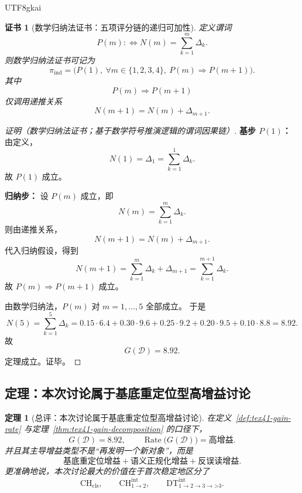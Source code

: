 \documentclass[12pt]{article}
\newtheorem{theorem}{定理}[section]
\newtheorem{Certificate}{证书}[section]
\newcommand{\Rate}{\operatorname{Rate}}
\begin{document}
\begin{CJK*}{UTF8}{gkai}
\begin{Certificate}[数学归纳法证书：五项评分链的递归可加性]
\label{cert:tex41-gain-decomposition}
定义谓词
\[
  P(m)
  :
  \Longleftrightarrow
  N(m)=\sum_{k=1}^{m}\Delta_k.
\]
则数学归纳法证书可记为
\[
  \pi_{\mathrm{ind}}
  =
  \bigl(
    P(1),\
    \forall m\in\{1,2,3,4\},\ P(m)\Rightarrow P(m+1)
  \bigr).
\]
其中
\[
  P(m)\Rightarrow P(m+1)
\]
仅调用递推关系
\[
  N(m+1)=N(m)+\Delta_{m+1}.
\]
\end{Certificate}

\begin{proof}[证明（数学归纳法证书；基于数学符号推演逻辑的谓词因果链）]
\textbf{基步 $P(1)$：}
由定义，
\[
  N(1)=\Delta_1=\sum_{k=1}^{1}\Delta_k.
\]
故 $P(1)$ 成立。

\textbf{归纳步：}
设 $P(m)$ 成立，即
\[
  N(m)=\sum_{k=1}^{m}\Delta_k.
\]
则由递推关系，
\[
  N(m+1)=N(m)+\Delta_{m+1}.
\]
代入归纳假设，得到
\[
  N(m+1)
  =
  \sum_{k=1}^{m}\Delta_k+\Delta_{m+1}
  =
  \sum_{k=1}^{m+1}\Delta_k.
\]
故 $P(m)\Rightarrow P(m+1)$ 成立。

由数学归纳法，$P(m)$ 对 $m=1,\dots,5$ 全部成立。
于是
\[
  N(5)
  =
  \sum_{k=1}^{5}\Delta_k
  =
  0.15\cdot 6.4
  +
  0.30\cdot 9.6
  +
  0.25\cdot 9.2
  +
  0.20\cdot 9.5
  +
  0.10\cdot 8.8
  =
  8.92.
\]
故
\[
  G(\mathcal D)=8.92.
\]
定理成立。证毕。
\end{proof}

\subsection{定理：本次讨论属于基底重定位型高增益讨论}
\label{subsec:tex41-ch2-theorem}

\begin{theorem}[总评：本次讨论属于基底重定位型高增益讨论]
\label{thm:tex41-gain-total}
在定义~\ref{def:tex41-gain-rate} 与定理~\ref{thm:tex41-gain-decomposition} 的口径下，
\[
  G(\mathcal D)=8.92,
  \qquad
  \Rate\bigl(G(\mathcal D)\bigr)=\text{高增益}.
\]
并且其主导增益类型不是“再发明一个新对象”，而是
\[
\boxed{
  \text{基底重定位增益}
  +
  \text{语义正规化增益}
  +
  \text{反误读增益}
}.
\]
更准确地说，本次讨论最大的价值在于首次稳定地区分了
\[
  \mathrm{CH}_{\mathrm{cls}},
  \qquad
  \mathrm{CH}^{\mathrm{int}}_{1\to2},
  \qquad
  \mathrm{DT}^{\mathrm{int}}_{1\to2\to3\to\text{>3}}.
\]
\end{theorem}


\end{CJK*}
\end{document}

